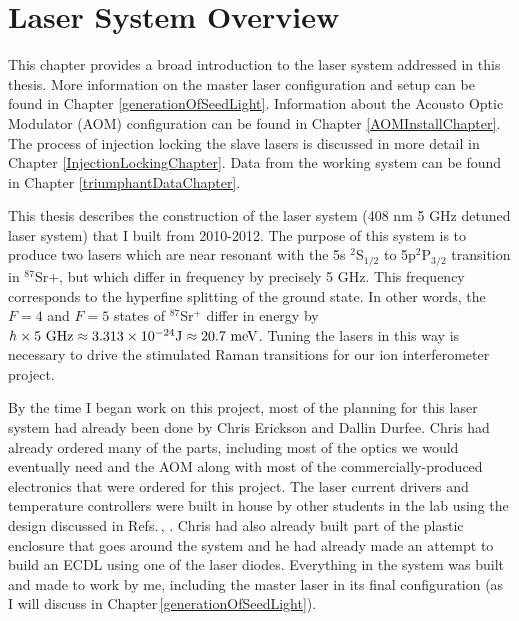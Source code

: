 \chapter{Laser System Overview}

This chapter provides a broad introduction to the laser system addressed in this thesis. More information on the master laser configuration and setup can be found in Chapter \ref{generationOfSeedLight}. Information about the Acousto Optic Modulator (AOM) configuration can be found in Chapter \ref{AOMInstallChapter}. The process of injection locking the slave lasers is discussed in more detail in Chapter \ref{InjectionLockingChapter}. Data from the working system can be found in Chapter \ref{triumphantDataChapter}.

This thesis describes the construction of the laser system (408 nm 5 GHz detuned laser system) that I built from 2010-2012. The purpose of this system is to produce two lasers which are near resonant with the 5s $^2$S$_{1/2}$ to 5p$^2$P$_{3/2}$ transition in $^{87}$Sr$+$, but which differ in frequency by precisely 5 GHz. This frequency corresponds to the hyperfine splitting of the ground state. In other words, the $F=4$ and $F=5$ states of $^{87}$Sr$^+$ differ in energy by $h\times 5\textnormal{ GHz}\approx 3.313 \times 10^{-24} \textnormal{J}\approx 20.7 \textnormal{ meV}$. Tuning the lasers in this way is necessary to drive the stimulated Raman transitions for our ion interferometer project. 

By the time I began work on this project, most of the planning for this laser system had already been done by Chris Erickson and Dallin Durfee. Chris had already ordered many of the parts, including most of the optics we would eventually need and the AOM along with most of the commercially-produced electronics that were ordered for this project. The laser current drivers and temperature controllers were built in house by other students in the lab using the design discussed in Refs.\,\cite{currentDriver1}, \cite{currentDriverNote}. Chris had also already built part of the plastic enclosure that goes around the system and he had already made an attempt to build an ECDL using one of the laser diodes. Everything in the system was built and made to work by me, including the master laser in its final configuration (as I will discuss in Chapter\,\ref{generationOfSeedLight}).

